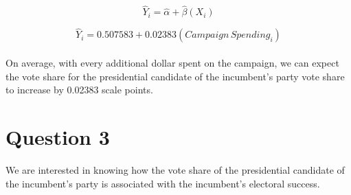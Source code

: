 \documentclass[12pt,letterpaper]{article}
\begin{document}
		{\large 			$$\hat{Y}_i = \hat{\alpha} +  \hat{\beta}(X_i) $$}
		
		
		{ 			$$\hat{Y}_i =  0.507583 +  0.02383(Campaign \, Spending_i) $$} \\
		
	
	\noindent On average, with every additional dollar spent on the campaign, we can expect the vote share for the presidential candidate of the incumbent's party vote share to increase by 0.02383 scale points.
		

	
	\newpage	
\section*{Question 3}

\noindent We are interested in knowing how the vote share of the presidential candidate of the incumbent's party is associated with the incumbent's electoral success.
	\vspace{.25cm}
\end{document}
